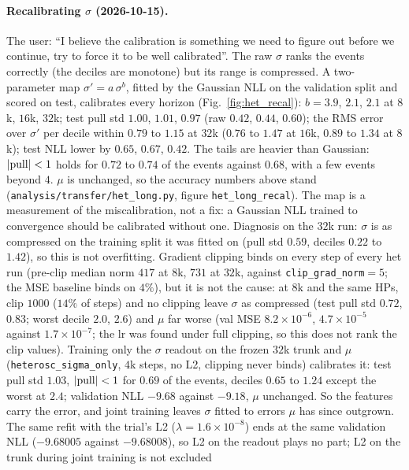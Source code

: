 \documentclass[11pt]{article}
\newcommand{\code}[1]{\texttt{#1}}
\begin{document}
\paragraph{Recalibrating $\sigma$ (2026-10-15).} The user: ``I believe the calibration is something we need to figure
out before we continue, try to force it to be well calibrated''. The raw $\sigma$ ranks the events correctly (the
deciles are monotone) but its range is compressed. A two-parameter map $\sigma'=a\,\sigma^b$, fitted by the Gaussian NLL
on the validation split and scored on test, calibrates every horizon (Fig.~\ref{fig:het_recal}): $b=3.9$, $2.1$, $2.1$ at
$8$k, $16$k, $32$k; test pull std $1.00$, $1.01$, $0.97$ (raw $0.42$, $0.44$, $0.60$); the RMS error over $\sigma'$
per decile within $0.79$ to $1.15$ at $32$k ($0.76$ to $1.47$ at $16$k, $0.89$ to $1.34$ at $8$k); test NLL lower by
$0.65$, $0.67$, $0.42$. The tails are heavier than Gaussian: $|{\rm pull}|<1$ holds for $0.72$ to $0.74$ of the events
against $0.68$, with a few events beyond $4$. $\mu$ is unchanged, so the accuracy numbers above stand
(\code{analysis/transfer/het\_long.py}, figure \code{het\_long\_recal}). The map is a measurement of the miscalibration, not a fix: a Gaussian NLL trained
to convergence should be calibrated without one. Diagnosis on the $32$k run: $\sigma$ is as compressed on the training
split it was fitted on (pull std $0.59$, deciles $0.22$ to $1.42$), so this is not overfitting. Gradient clipping binds on
every step of every het run (pre-clip median norm $417$ at $8$k, $731$ at $32$k, against \code{clip\_grad\_norm}$=5$; the
MSE baseline binds on $4\%$), but it is not the cause: at $8$k and the same HPs, clip $1000$ ($14\%$ of steps) and no
clipping leave $\sigma$ as compressed (test pull std $0.72$, $0.83$; worst decile $2.0$, $2.6$) and $\mu$ far worse
(val MSE $8.2\times10^{-6}$, $4.7\times10^{-5}$ against $1.7\times10^{-7}$; the lr was found under full clipping, so this
does not rank the clip values). Training only the $\sigma$ readout on the frozen $32$k trunk and $\mu$
(\code{heterosc\_sigma\_only}, $4$k steps, no L2, clipping never binds) calibrates it: test pull std $1.03$,
$|{\rm pull}|<1$ for $0.69$ of the events, deciles $0.65$ to $1.24$ except the worst at $2.4$; validation NLL $-9.68$
against $-9.18$, $\mu$ unchanged. So the features carry the error, and joint training leaves $\sigma$ fitted to errors
$\mu$ has since outgrown. The same refit with the trial's L2 ($\lambda=1.6\times10^{-8}$) ends at the same validation NLL
($-9.68005$ against $-9.68008$), so L2 on the readout plays no part; L2 on the trunk during joint training is not excluded
\end{document}
